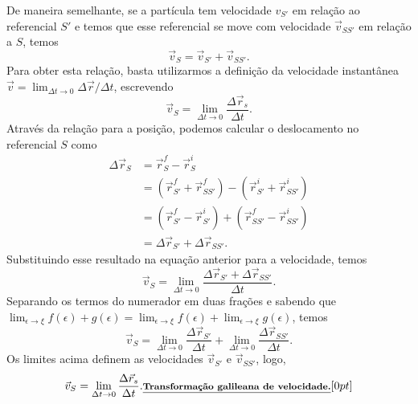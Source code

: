 De maneira semelhante, se a partícula tem velocidade $v_{S'}$ em relação ao referencial $S'$ e temos que esse referencial se move com velocidade $\vec{v}_{SS'}$ em relação a $S$, temos
\begin{equation}
  \vec{v}_S = \vec{v}_{S'} + \vec{v}_{SS'}.
\end{equation}
Para obter esta relação, basta utilizarmos a definição da velocidade instantânea $\vec{v} = \lim_{\Delta t \to 0} \Delta \vec{r} / \Delta t$, escrevendo
\begin{equation}
  \vec{v}_S = \lim_{\Delta t \to 0} \frac{\Delta \vec{r}_s}{\Delta t}.
\end{equation}
%
Através da relação para a posição, podemos calcular o deslocamento no referencial $S$ como
\begin{align}
  \Delta \vec{r}_S &= \vec{r}_S^f - \vec{r}_S^i \\
  &= (\vec{r}_{S'}^f + \vec{r}_{SS'}^f) - (\vec{r}_{S'}^i + \vec{r}_{SS'}^i) \\
  &= (\vec{r}_{S'}^f - \vec{r}_{S'}^i) + (\vec{r}_{SS'}^f - \vec{r}_{SS'}^i) \\
  &= \Delta \vec{r}_{S'} + \Delta \vec{r}_{SS'}.
\end{align}
%
Substituindo esse resultado na equação anterior para a velocidade, temos
\begin{equation}
  \vec{v}_S = \lim_{\Delta t \to 0} \frac{\Delta \vec{r}_{S'} + \Delta \vec{r}_{SS'}}{\Delta t}.
\end{equation}
%
Separando os termos do numerador em duas frações e sabendo que $\lim_{\epsilon \to \xi} f(\epsilon) + g(\epsilon) = \lim_{\epsilon \to \xi} f(\epsilon) + \lim_{\epsilon \to \xi} g(\epsilon)$, temos
\begin{equation}
  \vec{v}_S = \lim_{\Delta t \to 0} \frac{\Delta\vec{r}_{S'}}{\Delta t} + \lim_{\Delta t \to 0} \frac{\Delta \vec{r}_{SS'}}{\Delta t}.
\end{equation}
%
Os limites acima definem as velocidades $\vec{v}_{S'}$ e $\vec{v}_{SS'}$, logo,
\begin{equation}
  \vec{v}_S = \lim_{\Delta t \to 0} \frac{\Delta \vec{r}_s}{\Delta t}. \relax{\footnotesize\emph{\textbf{Transformação galileana de velocidade.}}}[0pt]
\end{equation}

